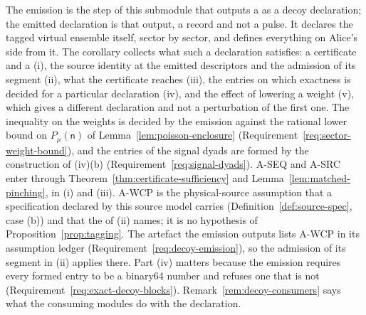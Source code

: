 The emission is the step of this submodule that outputs a
 as a decoy declaration; the emitted
declaration is that output, a record and not a pulse. It declares the tagged
virtual ensemble itself, sector by sector, and defines everything on Alice's
side from it. The corollary collects what such a declaration satisfies: a
certificate and a  (i), the source identity at the emitted descriptors and the
admission of its segment (ii), what the certificate reaches (iii), the entries
on which exactness is decided for a particular declaration (iv), and the effect
of lowering a weight (v), which gives a different declaration and not a
perturbation of the first one. The inequality on the weights is decided by
the emission against the rational lower bound on $P_\mu(\mathsf{n})$ of
Lemma~\ref{lem:poisson-enclosure} (Requirement~\ref{req:sector-weight-bound}),
and the entries of the signal dyads are formed by the construction of (iv)(b)
(Requirement~\ref{req:signal-dyads}). A-SEQ and A-SRC enter through
Theorem~\ref{thm:certificate-sufficiency} and Lemma~\ref{lem:matched-pinching}, in (i) and (iii).
A-WCP is the physical-source assumption that a specification declared by this
source model carries (Definition~\ref{def:source-spec}, case (b)) and that the
 of (ii) names; it is no hypothesis of
Proposition~\ref{prop:tagging}. The artefact the emission outputs lists A-WCP
in its assumption ledger (Requirement~\ref{req:decoy-emission}), so the
admission of its segment in (ii) applies there. Part (iv) matters because
the emission requires every formed entry to be a binary64 number and refuses one that is not
(Requirement~\ref{req:exact-decoy-blocks}). Remark~\ref{rem:decoy-consumers}
says what the consuming modules do with the declaration.

